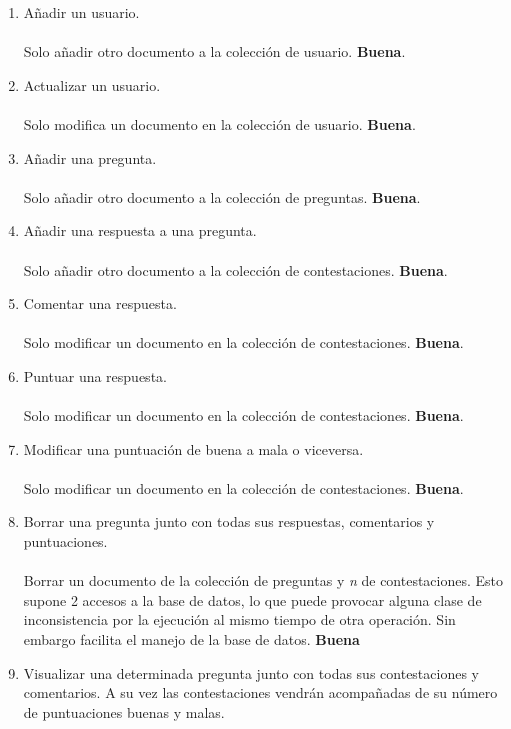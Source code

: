 \documentclass{article}
\begin{document}
    \begin{enumerate}
      \item Añadir un usuario. \\ \\
      Solo añadir otro documento a la colección de usuario. \textbf{Buena}.
      \item Actualizar un usuario. \\ \\
      Solo modifica un documento en la colección de usuario. \textbf{Buena}.
      \item Añadir una pregunta. \\ \\
      Solo añadir otro documento a la colección de preguntas. \textbf{Buena}.      
      \item Añadir una respuesta a una pregunta. \\ \\
      Solo añadir otro documento a la colección de contestaciones. \textbf{Buena}.
      \item Comentar una respuesta. \\ \\
      Solo modificar un documento en la colección de contestaciones. \textbf{Buena}.
      \item Puntuar una respuesta. \\ \\
      Solo modificar un documento en la colección de contestaciones. \textbf{Buena}.
      \item Modificar una puntuación de buena a mala o viceversa. \\ \\
      Solo modificar un documento en la colección de contestaciones. \textbf{Buena}.
      \item Borrar una pregunta junto con todas sus respuestas, comentarios y puntuaciones. \\ \\
      Borrar un documento de la colección de preguntas y \emph{n} de contestaciones.
      Esto supone 2 accesos a la base de datos, lo que puede provocar alguna clase de inconsistencia
      por la ejecución al mismo tiempo de otra operación. Sin embargo facilita el manejo de
      la base de datos. \textbf{Buena}
      \item Visualizar una determinada pregunta junto con todas sus contestaciones
      y comentarios. A su vez las contestaciones vendrán acompañadas de su
      número de puntuaciones buenas y malas. \\ \\

\end{enumerate}
\end{document}
